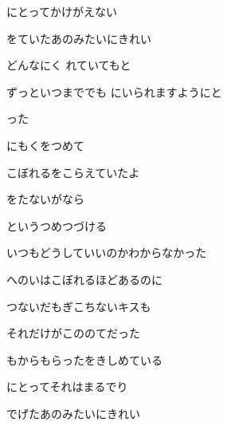 \documentclass[14pt]{ltjsarticle}
\begin{document}
{  にとってかけがえない
  \jisho{}

  をていたあのみたいにきれい
  \jisho{}

\item

どんなにく れていてもと
  \jisho{}


ずっといつまででも にいられますようにと
  \jisho{}

  った
  \jisho{}

\item
  にもくをつめて
  \jisho{}


こぼれるをこらえていたよ
  \jisho{}

  をたないがなら
  \jisho{}

  というつめつづける
  \jisho{}

\item

いつもどうしていいのかわからなかった
  \jisho{}

  へのいはこぼれるほどあるのに
  \jisho{}


つないだもぎこちないキスも
  \jisho{}


それだけがこののてだった
  \jisho{}

  もからもらったをきしめている
  \jisho{}

  にとってそれはまるでり
  \jisho{}

  でげたあのみたいにきれい
  \jisho{}

}
\end{document}
